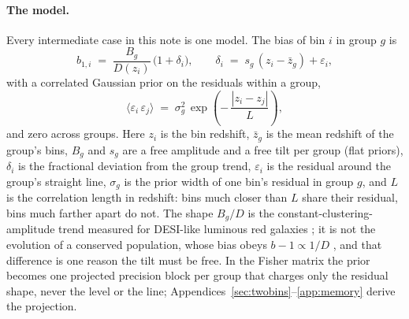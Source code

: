 \documentclass[11pt]{article}
\begin{document}
\paragraph{The model.}
Every intermediate case in this note is one model.  The bias of bin
$i$ in group $g$ is
\begin{equation}
  b_{1,i} \;=\; \frac{B_g}{D(z_i)}\,\bigl(1 + \delta_i\bigr),
  \qquad
  \delta_i \;=\; s_g\,(z_i - \bar{z}_g) + \varepsilon_i ,
  \label{eq:summodel}
\end{equation}
with a correlated Gaussian prior on the residuals within a group,
\begin{equation}
  \bigl\langle \varepsilon_i\,\varepsilon_j \bigr\rangle
  \;=\; \sigma_g^2\,
  \exp\!\left(-\,\frac{|z_i - z_j|}{L}\right),
  \label{eq:sumkernel}
\end{equation}
and zero across groups.  Here $z_i$ is the bin redshift, $\bar{z}_g$
is the mean redshift of the group's bins, $B_g$ and $s_g$ are a free
amplitude and a free tilt per group (flat priors), $\delta_i$ is the
fractional deviation from the group trend, $\varepsilon_i$ is the
residual around the group's straight line, $\sigma_g$ is the prior
width of one bin's residual in group $g$, and $L$ is the correlation
length in redshift: bins much closer than $L$ share their residual,
bins much farther apart do not.  The shape $B_g/D$ is the
constant-clustering-amplitude trend measured for DESI-like luminous
red galaxies \cite{Zhou2021}; it is not the evolution of a conserved
population, whose bias obeys $b - 1 \propto 1/D$ \cite{Fry1996}, and
that difference is one reason the tilt must be free.  In the Fisher
matrix the prior becomes one projected precision block per group that
charges only the residual shape, never the level or the line;
Appendices~\ref{sec:twobins}--\ref{app:memory} derive the projection.
\end{document}

